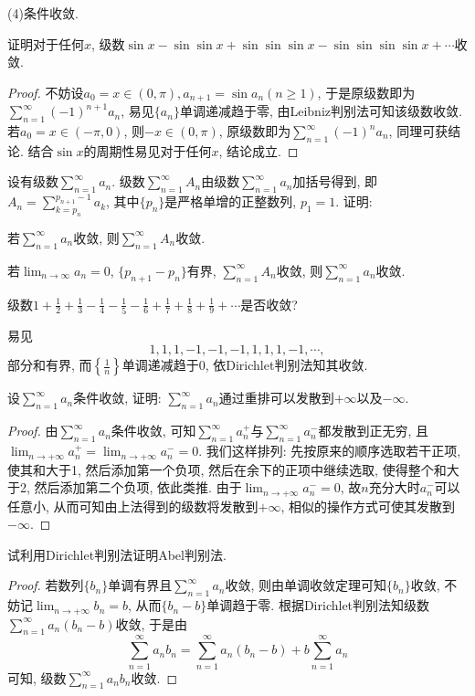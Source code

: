 \begin{quiza}
\begin{solution}
(4)条件收敛.
\end{solution}
\woe 证明对于任何\(x\), 级数\(\sin x-\sin\sin x+\sin\sin\sin x-\sin\sin\sin\sin x+\cdots\)收敛.
\begin{proof}
不妨设\(a_0=x\in(0,\pi),a_{n+1}=\sin a_n(n\geqslant 1)\), 于是原级数即为\(\sum_{n=1}^{\infty}(-1)^{n+1}a_n\), 易见\(\{a_{n}\}\)单调递减趋于零, 由Leibniz判别法可知该级数收敛. 若\(a_0=x\in(-\pi,0)\), 则\(-x\in(0,\pi)\), 原级数即为\(\sum_{n=1}^{\infty}(-1)^{n}a_n\), 同理可获结论. 结合\(\sin x\)的周期性易见对于任何\(x\), 结论成立.
\end{proof}
\woe 设有级数\(\sum_{n=1}^{\infty}a_n\). 级数\(\sum_{n=1}^{\infty}A_n\)由级数\(\sum_{n=1}^{\infty}a_n\)加括号得到, 即\( A_n=\sum_{k=p_n}^{p_{n+1}-1}a_k\), 其中\(\{p_n\}\)是严格单增的正整数列, \(p_1=1\). 证明:
\begin{quizs}
\item 若\(\sum_{n=1}^{\infty}a_n\)收敛, 则\(\sum_{n=1}^{\infty}A_n\)收敛.
\item 若\(\lim_{n\rightarrow\infty}a_n=0\), \(\{p_{n+1}-p_n\}\)有界, \(\sum_{n=1}^{\infty}A_n\)收敛, 则\(\sum_{n=1}^{\infty}a_n\)收敛.
\end{quizs}
\woe 级数\(1+\frac{1}{2}+\frac{1}{3}-\frac{1}{4}-\frac{1}{5}-\frac{1}{6}+\frac{1}{7}+\frac{1}{8}+\frac{1}{9}+\cdots\)是否收敛?
\begin{solution}
易见\[1,1,1,-1,-1,-1,1,1,1,-1,\cdots,\]部分和有界, 而\(\left\lbrace\frac{1}{n}\right\rbrace \)单调递减趋于0, 依Dirichlet判别法知其收敛.
\end{solution}
\woe 设\(\sum_{n=1}^{\infty}a_n\)条件收敛, 证明: \(\sum_{n=1}^{\infty}a_n\)通过重排可以发散到\(+\infty\)以及\(-\infty\).
\begin{proof}
由\(\sum_{n=1}^{\infty}a_n\)条件收敛, 可知\(\sum_{n=1}^{\infty}a_n^+\)与\(\sum_{n=1}^{\infty}a_n^-\)都发散到正无穷, 且\(\lim_{n\rightarrow+\infty}a_n^+=\lim_{n\rightarrow+\infty}a_n^-=0\). 我们这样排列: 先按原来的顺序选取若干正项, 使其和大于1, 然后添加第一个负项, 然后在余下的正项中继续选取, 使得整个和大于2, 然后添加第二个负项, 依此类推. 由于\(\lim_{n\rightarrow+\infty}a_n^-=0\), 故\(n\)充分大时\(a_n^-\)可以任意小, 从而可知由上法得到的级数将发散到\(+\infty\), 相似的操作方式可使其发散到\(-\infty\).
\end{proof}
\woe 试利用Dirichlet判别法证明Abel判别法.
\begin{proof}
若数列\(\{b_n\}\)单调有界且\(\sum_{n=1}^{\infty}a_n\)收敛, 则由单调收敛定理可知\(\{b_n\}\)收敛, 不妨记\(\lim_{n\rightarrow+\infty}b_n=b\), 从而\(\{b_n-b\}\)单调趋于零. 根据Dirichlet判别法知级数\(\sum_{n=1}^{\infty}a_n(b_n-b)\)收敛, 于是由\[\sum_{n=1}^{\infty}a_nb_n=\sum_{n=1}^{\infty}a_n(b_n-b)+b\sum_{n=1}^{\infty}a_n\]可知, 级数\(\sum_{n=1}^{\infty}a_nb_n\)收敛.

\end{proof}
\end{quiza}
